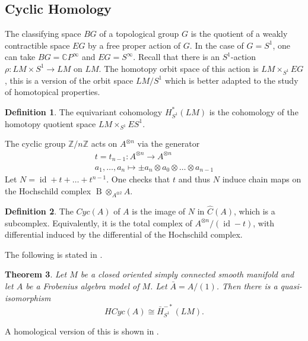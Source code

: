 \documentclass{scrartcl}
\let\emph\relax
\theoremstyle{plain}
\newtheorem{theorem}{Theorem}[section]
\theoremstyle{definition}
\newtheorem{definition}[theorem]{Definition}
\newcommand{\C}{\mathbb C}
\newcommand{\Z}{\mathbb Z}
\newcommand{\iso}{\cong}
\DeclareMathOperator{\id}{id}
\DeclareMathOperator{\BC}{B}
\DeclareMathOperator{\cConf}{\overline{Conf}}
\begin{document}




\subsection{Cyclic Homology}

The classifying space $BG$ of a topological group $G$ is the quotient of a weakly contractible space $EG$ by a free proper action of $G$. In the case of $G=S^1$, one can take $BG = \C P^\infty$ and $EG = S^\infty$. Recall that there is an $S^1$-action $\rho\colon LM\times S^1\to LM$ on $LM$. The homotopy orbit space of this action is $LM\times_{S^1} EG$, this is a version of the orbit space $LM/S^1$ which is better adapted to the study of homotopical properties. 
\begin{definition}
The equivariant cohomology $H_{S^1}^*(LM)$ is the cohomology of the homotopy quotient space $LM\times_{S^1} ES^1$.
\end{definition}

The cyclic group $\Z/n\Z$ acts on $A^{\otimes n}$ via the generator
\begin{align*}
    t=t_{n-1}\colon A^{\otimes n}\to A^{\otimes n} \\
    a_1, \dots, a_n \mapsto \pm a_n\otimes a_0\otimes\dots\otimes a_{n-1}
\end{align*}
Let $N = \id+t+\dots+t^{n-1}$. One checks that $t$ and thus $N$ induce chain maps on the Hochschild complex $\BC\otimes_{A^{\otimes 2}} A $.

\begin{definition}
The \emph{cyclic complex} $Cyc(A)$ of $A$ is the image of $N$ in $\hat C(A)$, which is a subcomplex.  Equivalently, it is the total complex of $A^{\otimes n} / (\id-t)$, with differential induced by the differential of the Hochschild complex. 
\end{definition}

The following is stated in \cite{naef2019string}.
\begin{theorem}
Let $M$ be a closed oriented simply connected smooth manifold and let $A$ be a Frobenius algebra model of $M$. Let $\bar A = A / (1)$. Then there is a quasi-isomorphism \begin{equation}HCyc(A) \iso \bar H^{-*}_{S^1}(LM).\label{eq:cyc-iso}\end{equation} 
\end{theorem}
A homological version of this is shown in \cite{Chen_2010}. 
\end{document}
